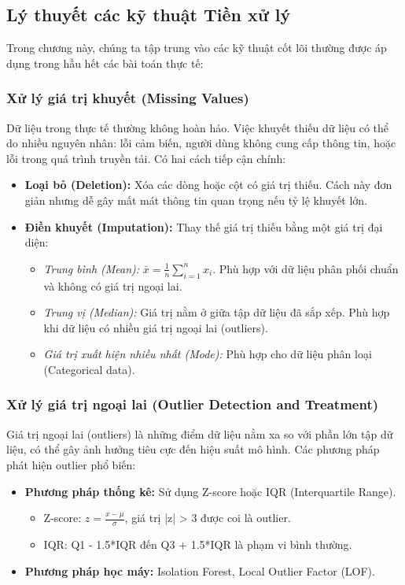 \subsection{Lý thuyết các kỹ thuật Tiền xử lý}
Trong chương này, chúng ta tập trung vào các kỹ thuật cốt lõi thường được áp dụng trong hầu hết các bài toán thực tế:

\subsubsection{Xử lý giá trị khuyết (Missing Values)}
Dữ liệu trong thực tế thường không hoàn hảo. Việc khuyết thiếu dữ liệu có thể do nhiều nguyên nhân: lỗi cảm biến, người dùng không cung cấp thông tin, hoặc lỗi trong quá trình truyền tải. Có hai cách tiếp cận chính:
\begin{itemize}
    \item \textbf{Loại bỏ (Deletion):} Xóa các dòng hoặc cột có giá trị thiếu. Cách này đơn giản nhưng dễ gây mất mát thông tin quan trọng nếu tỷ lệ khuyết lớn.
    \item \textbf{Điền khuyết (Imputation):} Thay thế giá trị thiếu bằng một giá trị đại diện:
    \begin{itemize}
        \item \textit{Trung bình (Mean):} $\bar{x} = \frac{1}{n} \sum_{i=1}^{n} x_i$. Phù hợp với dữ liệu phân phối chuẩn và không có giá trị ngoại lai.
        \item \textit{Trung vị (Median):} Giá trị nằm ở giữa tập dữ liệu đã sắp xếp. Phù hợp khi dữ liệu có nhiều giá trị ngoại lai (outliers).
        \item \textit{Giá trị xuất hiện nhiều nhất (Mode):} Phù hợp cho dữ liệu phân loại (Categorical data).
    \end{itemize}
\end{itemize}

\subsubsection{Xử lý giá trị ngoại lai (Outlier Detection and Treatment)}
Giá trị ngoại lai (outliers) là những điểm dữ liệu nằm xa so với phần lớn tập dữ liệu, có thể gây ảnh hưởng tiêu cực đến hiệu suất mô hình. Các phương pháp phát hiện outlier phổ biến:
\begin{itemize}
    \item \textbf{Phương pháp thống kê:} Sử dụng Z-score hoặc IQR (Interquartile Range).
    \begin{itemize}
        \item Z-score: $z = \frac{x - \mu}{\sigma}$, giá trị |z| > 3 được coi là outlier.
        \item IQR: Q1 - 1.5*IQR đến Q3 + 1.5*IQR là phạm vi bình thường.
    \end{itemize}
    \item \textbf{Phương pháp học máy:} Isolation Forest, Local Outlier Factor (LOF).
\end{itemize}

